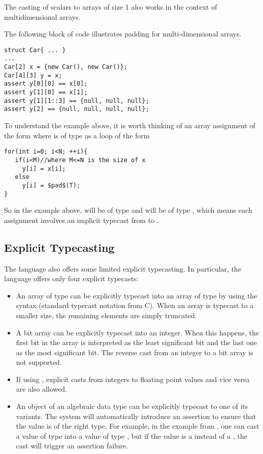 The casting of scalars to arrays of size 1 also works in the context of multidimensional arrays.
\begin{Example}
The following block of code illustrates padding for multi-dimensional arrays.
\begin{lstlisting}
struct Car{ ... }
...
Car[2] x = {new Car(), new Car()};
Car[4][3] y = x;
assert y[0][0] == x[0];
assert y[1][0] == x[1];
assert y[1][1::3] == {null, null, null};
assert y[2] == {null, null, null, null};
\end{lstlisting}
\end{Example}

To understand the example above, it is worth thinking of an array assignment of the form  where  is of type  as a loop of the form
\begin{lstlisting}
for(int i=0; i<N; ++i){
   if(i<M)//where M<=N is the size of x
     y[i] = x[i];
   else
     y[i] = $pad$(T);
}
\end{lstlisting}
So in the example above,  will be of type  and  will be of type , which means each assignment involves an implicit typecast from  to .


\subsection{Explicit Typecasting}
The \Sk{} language also offers some limited explicit typecasting. In particular, the language offers only four explicit typecasts:
\begin{itemize}

\item An array  of type  can be explicitly typecast into an array of type  by using the syntax  (standard typecast notation from C). When an array is typecast to a smaller size, the remaining elements are simply truncated.

\item A bit array  can be explicitly typecast into an integer. When this happens, the first bit in the array is interpreted as the least significant bit and the last one as the most significant bit. The reverse cast from an integer to a bit array is not supported.

\item If using , explicit casts from integers to floating point values and vice versa are also allowed.
\item An object of an algebraic data type can be explicitly typecast to one of its variants. The system will automatically introduce an assertion to ensure that the value is of the right type. For example, in the  example from , one can cast a value of type  into a value of type , but if the value is a  instead of a , the cast will trigger an assertion failure.
\end{itemize}

